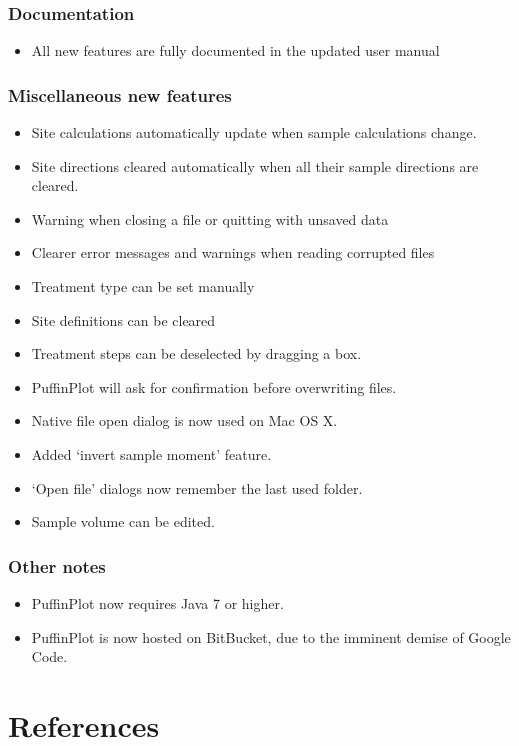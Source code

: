 \documentclass[a4paper,british]{article}
\begin{document}
\subsubsection*{Documentation}
\label{sec-1-6}
\begin{itemize}
\item All new features are fully documented in the updated user manual
\end{itemize}

\subsubsection*{Miscellaneous new features}
\label{sec-1-7}
\begin{itemize}
\item Site calculations automatically update when sample calculations
change.
\item Site directions cleared automatically when all their sample
directions are cleared.
\item Warning when closing a file or quitting with unsaved data
\item Clearer error messages and warnings when reading corrupted files
\item Treatment type can be set manually
\item Site definitions can be cleared
\item Treatment steps can be deselected by dragging a box.
\item PuffinPlot will ask for confirmation before overwriting files.
\item Native file open dialog is now used on Mac OS X.
\item Added `invert sample moment' feature.
\item `Open file' dialogs now remember the last used folder.
\item Sample volume can be edited.
\end{itemize}

\subsubsection*{Other notes}
\label{sec-1-8}
\begin{itemize}
\item PuffinPlot now requires Java 7 or higher.
\item PuffinPlot is now hosted on BitBucket, due to the imminent demise
  of Google Code.
\end{itemize}

\clearpage
\renewcommand*{\refname}{\vspace{-1cm}} 
\section{References}


\end{document}
